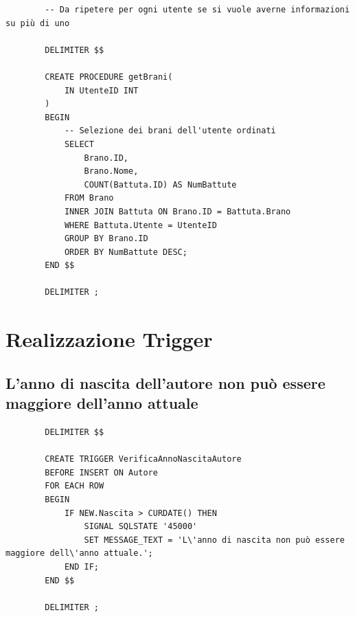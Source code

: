 \documentclass{article}
\begin{document}
    \begin{verbatim}
        -- Da ripetere per ogni utente se si vuole averne informazioni su più di uno

        DELIMITER $$

        CREATE PROCEDURE getBrani(
            IN UtenteID INT
        )
        BEGIN
            -- Selezione dei brani dell'utente ordinati
            SELECT
                Brano.ID,
                Brano.Nome,
                COUNT(Battuta.ID) AS NumBattute
            FROM Brano
            INNER JOIN Battuta ON Brano.ID = Battuta.Brano
            WHERE Battuta.Utente = UtenteID
            GROUP BY Brano.ID
            ORDER BY NumBattute DESC;
        END $$

        DELIMITER ;
    \end{verbatim}
    
    \section{Realizzazione Trigger}
    
    \subsection{L’anno di nascita dell’autore non può essere maggiore dell’anno attuale}
    
    \begin{verbatim}
        DELIMITER $$

        CREATE TRIGGER VerificaAnnoNascitaAutore
        BEFORE INSERT ON Autore
        FOR EACH ROW
        BEGIN
            IF NEW.Nascita > CURDATE() THEN
                SIGNAL SQLSTATE '45000'
                SET MESSAGE_TEXT = 'L\'anno di nascita non può essere maggiore dell\'anno attuale.';
            END IF;
        END $$

        DELIMITER ;
    \end{verbatim}
    
    \subsection{}
\end{document}
